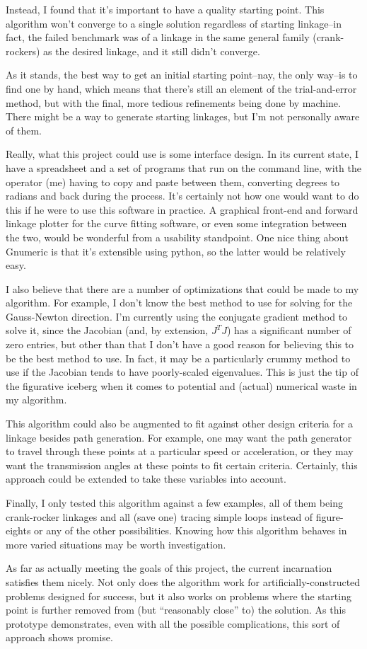 \documentclass[12pt, letterpaper]{article}
\begin{document}
Instead, I found that it's important to have a quality starting point.  This algorithm won't converge to a single solution regardless of starting linkage--in fact, the failed benchmark was of a linkage in the same general family (crank-rockers) as the desired linkage, and it still didn't converge.

As it stands, the best way to get an initial starting point--nay, the only way--is to find one by hand, which means that there's still an element of the trial-and-error method, but with the final, more tedious refinements being done by machine.  There might be a way to generate starting linkages, but I'm not personally aware of them.

Really, what this project could use is some interface design.  In its current state, I have a spreadsheet and a set of programs that run on the command line, with the operator (me) having to copy and paste between them, converting degrees to radians and back during the process. It's certainly not how one would want to do this if he were to use this software in practice. A graphical front-end and forward linkage plotter for the curve fitting software, or even some integration between the two, would be wonderful from a usability standpoint.  One nice thing about Gnumeric is that it's extensible using python, so the latter would be relatively easy.

I also believe that there are a number of optimizations that could be made to my algorithm. For example, I don't know the best method to use for solving for the Gauss-Newton direction.  I'm currently using the conjugate gradient method to solve it, since the Jacobian (and, by extension, \(J^TJ\)) has a significant number of zero entries, but other than that I don't have a good reason for believing this to be the best method to use. In fact, it may be a particularly crummy method to use if the Jacobian tends to have poorly-scaled eigenvalues. This is just the tip of the figurative iceberg when it comes to potential and (actual) numerical waste in my algorithm.

This algorithm could also be augmented to fit against other design criteria for a linkage besides path generation. For example, one may want the path generator to travel through these points at a particular speed or acceleration, or they may want the transmission angles at these points to fit certain criteria.  Certainly, this approach could be extended to take these variables into account.

Finally, I only tested this algorithm against a few examples, all of them being 
crank-rocker linkages and all (save one) tracing simple loops instead of figure-eights or any of the other possibilities. Knowing how this algorithm behaves in more varied situations may be worth investigation.

As far as actually meeting the goals of this project, the current incarnation satisfies them nicely. Not only does the algorithm work for artificially-constructed problems designed for success, but it also works on problems where the starting point is further removed from (but ``reasonably close'' to) the solution. As this prototype demonstrates, even with all the possible complications, this sort of approach shows promise.
\end{document}
